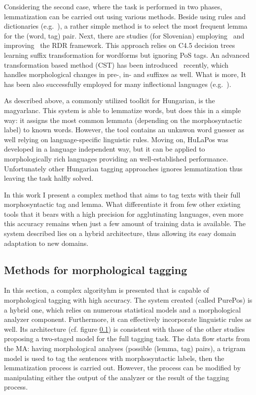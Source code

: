Considering the second case, where the task is performed in two phases, lemmatization can be carried out using various methods.
Beside using rules and dictionaries (e.g.~\cite{}), a rather simple method is to select the most frequent lemma for the (word, tag) pair.
Next, there are studies (for Slovenian) employing~\cite{} and improving~\cite{} the RDR framework.
This approach relies on C4.5 decision trees learning suffix transformation for wordforms but ignoring PoS tags.
An advanced transformation based method (CST) has been introduced~\cite{} recently, which handles morphological changes in pre-, in- and suffixes as well.
What is more, It has been also successfully employed for many inflectional languages (e.g.~\cite{}).

As described above, a commonly utilized toolkit for Hungarian, is the magyarlanc.
This system is able to lemmatize words, but does this in a simple way: it assigns the most common lemmata (depending on the morphosyntactic label) to known words.
However, the tool contains an unknwon word guesser as well relying on language-specific linguistic rules.
Moving on, HuLaPos was developed in a language independent way, but it can be applied to morphologically rich languages providing an well-established performance.
Unfortunately other Hungarian tagging approaches ignores lemmatization thus leaving the task halfly solved.

In this work I present a complex method that aims to tag texts with their full morphosyntactic tag and lemma.
What differentiate it from few other existing tools that it bears with a high precision for agglutinating languages, even more this accuracy remains when just a few amount of training data is available.
The system described lies on a hybrid architecture, thus allowing its easy domain adaptation to new domains. 

\subsection{Methods for morphological tagging }

In this section, a complex algorityhm is presented that is capable of morphological tagging with high accuracy.
The system created (called PurePos) is a hybrid one, which relies on numerous statistical models and a morphological analyzer component.
Furthermore, it can effectively incorporate linguistic rules as well.
Its architecture (cf. figure \ref{}) is consistent with those of the other studies~\cite{} proposing a two-staged model for the full tagging task.
The data flow starts from the MA: having morphological analyses (possible (lemma, tag) pairs), a trigram model is used to tag the sentences with morphosyntactic labels, then the lemmatization process is carried out.
However, the process can be modified by manipulating either the output of the analyzer or the result of the tagging process.

